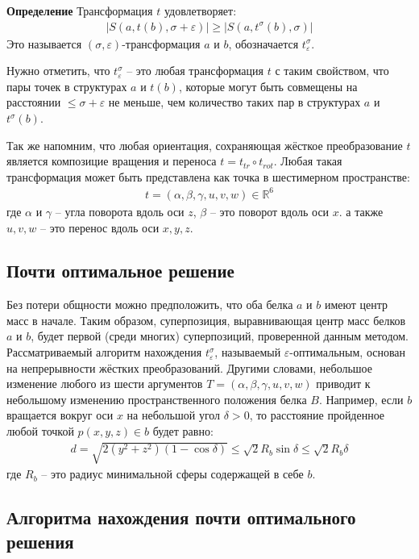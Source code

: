 \documentclass[a4papper]{article}
\newcommand{\bb}{\textbf}
\newcommand{\eps}{\varepsilon}
\begin{document}
\bb{Определение} Трансформация $t$ удовлетворяет:
\begin{gather*}
|S(a, t(b), \sigma + \eps)| \geq |S(a, t^\sigma (b), \sigma)|
\end{gather*}
Это называется $(\sigma, \eps)$-трансформация $a$ и $b$, обозначается $t_\eps^\sigma$.

Нужно отметить, что $t_\eps^\sigma$ -- это любая трансформация $t$ с таким свойством, что пары точек в структурах $a$ и $t(b)$, которые могут быть совмещены на расстоянии $\leq \sigma + \eps$ не меньше, чем количество таких пар в структурах $a$ и $t^\sigma(b)$.

Так же напомним, что любая ориентация, сохраняющая жёсткое преобразование $t$ является композицие вращения и переноса $t = t_{tr} \circ t_{rot}$. Любая такая трансформация может быть представлена как точка в шестимерном пространстве:
\begin{gather*}
t = (\alpha, \beta, \gamma, u, v, w) \in \mathbb{R}^6
\end{gather*}
где $\alpha$ и $\gamma$ -- угла поворота вдоль оси $z$, $\beta$ -- это поворот вдоль оси $x$. а также $u, v, w$  -- это перенос вдоль оси $x, y, z$.

\subsection{ Почти оптимальное решение }
Без потери общности можно предположить, что оба белка $a$ и $b$ имеют центр масс в начале. Таким образом, суперпозиция, выравнивающая центр масс белков $a$ и $b$, будет первой (среди многих) суперпозиций, проверенной данным методом. Рассматриваемый алгоритм нахождения $t_\eps^\sigma$, называемый $\eps$-оптимальным, основан на непрерывности жёстких преобразований. Другими словами, небольшое изменение любого из шести аргументов $T=(\alpha, \beta, \gamma, u, v, w)$ приводит к небольшому изменению пространственного положения белка $B$. Например, если $b$ вращается вокруг оси $x$ на небольшой угол $\delta > 0$, то расстояние пройденное любой точкой $p(x, y, z) \in b$ будет равно:
\begin{gather*}
d = \sqrt{2(y^2 + z^2)(1 - \cos \delta)} \leq \sqrt{2}R_b\sin\delta \leq \sqrt{2} R_b\delta
\end{gather*}  
где $R_b$ -- это радиус минимальной сферы содержащей в себе $b$.

\subsection{ Алгоритма нахождения почти оптимального решения}
\end{document}

